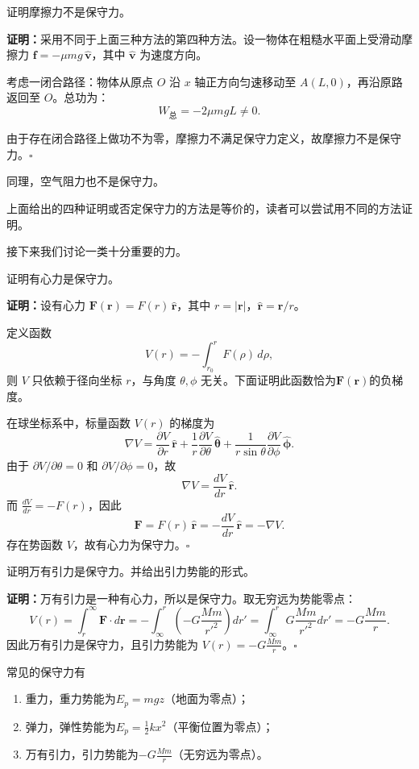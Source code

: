\documentclass[UTF-8]{ctexart}
\begin{document}
\begin{tcolorbox}[colback=white!5!white, colframe=green!50!black, title=摩擦力]
证明摩擦力不是保守力。
\end{tcolorbox}
\noindent \textbf{证明：}采用不同于上面三种方法的第四种方法。设一物体在粗糙水平面上受滑动摩擦力 \( \mathbf{f} = -\mu mg \,\hat{\mathbf{v}} \)，其中 \(\hat{\mathbf{v}}\) 为速度方向。

考虑一闭合路径：物体从原点 \(O\) 沿 \(x\) 轴正方向匀速移动至 \(A(L,0)\)，再沿原路返回至 \(O\)。总功为：
\[
W_{\text{总}} = -2\mu mg L \neq 0.
\]

由于存在闭合路径上做功不为零，摩擦力不满足保守力定义，故摩擦力不是保守力。\hfill$\square$

同理，空气阻力也不是保守力。

上面给出的四种证明或否定保守力的方法是等价的，读者可以尝试用不同的方法证明。

接下来我们讨论一类十分重要的力。
\begin{tcolorbox}[colback=white!5!white, colframe=green!50!black, title=有心力]
证明有心力是保守力。
\end{tcolorbox}
\noindent \textbf{证明：}设有心力 \(\mathbf{F}(\mathbf{r}) = F(r)\,\hat{\mathbf{r}}\)，其中 \(r = |\mathbf{r}|\)，\(\hat{\mathbf{r}} = \mathbf{r}/r\)。

定义函数
\[
V(r) = -\int_{r_0}^{r} F(\rho)\,d\rho,
\]
则 \(V\) 只依赖于径向坐标 \(r\)，与角度 \(\theta,\phi\) 无关。下面证明此函数恰为$\mathbf{F}(\mathbf{r}) $的负梯度。

在球坐标系中，标量函数 \(V(r)\) 的梯度为
\[
\nabla V = \frac{\partial V}{\partial r}\,\hat{\mathbf{r}} + \frac{1}{r}\frac{\partial V}{\partial \theta}\,\hat{\boldsymbol{\theta}} + \frac{1}{r\sin\theta}\frac{\partial V}{\partial \phi}\,\hat{\boldsymbol{\phi}}.
\]
由于 \(\partial V/\partial\theta = 0\) 和 \(\partial V/\partial\phi = 0\)，故
\[
\nabla V = \frac{dV}{dr}\,\hat{\mathbf{r}}.
\]
而 \(\frac{dV}{dr} = -F(r)\)，因此
\[
\mathbf{F} = F(r)\,\hat{\mathbf{r}} = -\frac{dV}{dr}\,\hat{\mathbf{r}} = -\nabla V.
\]
存在势函数 \(V\)，故有心力为保守力。\hfill$\square$
\begin{tcolorbox}[colback=white!5!white,colframe=green!50!black,title=万有引力]
证明万有引力是保守力。并给出引力势能的形式。
\end{tcolorbox}
\noindent \textbf{证明：}万有引力是一种有心力，所以是保守力。取无穷远为势能零点：
\[
V(r) = \int_{r}^{\infty} \mathbf{F}\cdot d\mathbf{r} = -\int_{\infty}^{r} \left(-G\frac{Mm}{r'^2}\right) dr' = \int_{\infty}^{r} G\frac{Mm}{r'^2} dr' = -G\frac{Mm}{r}.
\]
因此万有引力是保守力，且引力势能为 \(V(r) = -G\frac{Mm}{r}\)。\hfill$\square$
\begin{tcolorbox}[colback=white!5!white, colframe=red!75!black, title=常见保守力小结]
常见的保守力有
\begin{enumerate}
\item 重力，重力势能为$E_p = mgz$（地面为零点）；
\item 弹力，弹性势能为$E_p =  \frac{1}{2}k x^2 $（平衡位置为零点）；
\item 万有引力，引力势能为$-G\frac{Mm}{r}$（无穷远为零点）。
\end{enumerate}
\end{tcolorbox}
\end{document}

